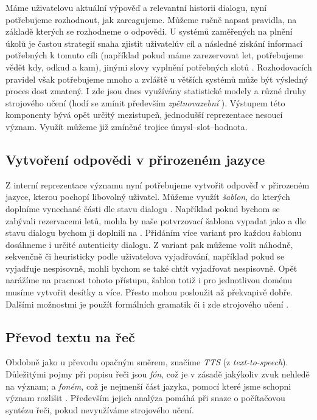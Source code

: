 Máme uživatelovu aktuální výpověď a relevantní historii dialogu, nyní potřebujeme
rozhodnout, jak zareagujeme. Můžeme ručně napsat pravidla, na základě kterých
se rozhodneme o odpovědi. U systémů zaměřených na plnění úkolů je častou
strategií snaha zjistit uživatelův cíl a následné získání informací potřebných
k tomuto cíli (například pokud máme zarezervovat let, potřebujeme vědět kdy,
odkud a kam), jinými slovy vyplnění potřebných slotů \citep[strany 504-506]{jurafsky_slp_2020}. Rozhodovacích pravidel
však potřebujeme mnoho a zvláště u větších systémů může být výsledný proces dost
zmatený. I zde jsou dnes využívány statistické modely a různé druhy strojového
učení (hodí se zmínit především \textit{zpětnovazební} \citep{su_reward_2015}). Výstupem této komponenty
bývá opět určitý mezistupeň, jednodušší reprezentace nesoucí význam. Využít
můžeme již zmíněné trojice úmysl--slot--hodnota.

\subsection{Vytvoření odpovědi v přirozeném jazyce}\label{nlg}

Z interní reprezentace významu nyní potřebujeme vytvořit odpověď v přirozeném
jazyce, kterou pochopí libovolný uživatel. Můžeme využít \textit{šablon}, do
kterých doplníme vynechané části dle stavu dialogu \citep[strana 508]{jurafsky_slp_2020}. Například pokud bychom
se zabývali rezervacemi letů, mohla by naše potvrzovací šablona vypadat jako
 a dle stavu dialogu
bychom ji doplnili na .
Přidáním více variant pro každou šablonu dosáhneme i určité autenticity dialogu.
Z variant pak můžeme volit náhodně, sekvenčně či heuristicky podle uživatelova
vyjadřování, například pokud se vyjadřuje nespisovně, mohli bychom se také
chtít vyjadřovat nespisovně. Opět narážíme na pracnost tohoto přístupu, šablon
totiž i pro jednotlivou doménu musíme vytvořit desítky a více. Přesto mohou
posloužit až překvapivě dobře. Dalšími možnostmi je použít formálních gramatik
\citep{teich_grammars_1999} či i zde strojového učení \citep{wen_stochastic_2015}.

\subsection{Převod textu na řeč}\label{tts}

Obdobně jako u převodu opačným směrem, značíme \textit{TTS} (z \textit{text-to-speech}).
Důležitými pojmy
při popisu řeči jsou \textit{fón}, což je v zásadě jakýkoliv zvuk nehledě na
význam; a \textit{foném}, což je nejmenší část jazyka,
pomocí které jsme schopni význam rozlišit \citep[kapitola 1]{li2020universal}. Především jejich analýza pomáhá
při snaze o počítačovou syntézu řeči, pokud nevyužíváme strojového učení.

